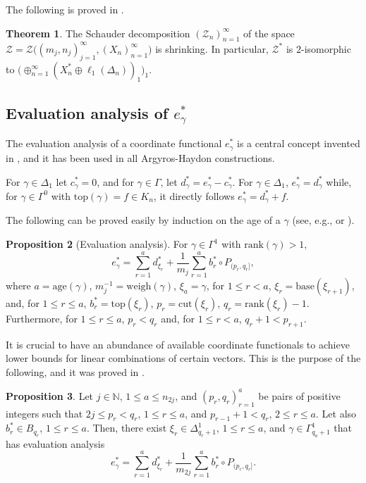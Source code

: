 \documentclass[11pt]{amsart}
\theoremstyle{definition}
\newtheorem{theorem}{Theorem}[section]
\newtheorem{proposition}[theorem]{Proposition}
\newcommand{\N}{\mathbb{N}}
\numberwithin{equation}{section}
\begin{document}
The following is proved in \cite[Corollary 5.15]{zisimopoulou:2014}.

\begin{theorem}
\label{shrinking and duality}
The Schauder decomposition $(\mathcal{Z}_n)_{n=1}^\infty$ of the space $\mathcal{Z} = \mathcal{Z}\big((m_j,n_j)_{j=1}^\infty,(X_n)_{n=1}^\infty\big)$ is shrinking. In particular, $\mathcal{Z}^*$ is $2$-isomorphic to $\big(\oplus_{n=1}^\infty(X_n^*\oplus\ell_1(\Delta_n))_1\big)_1$.
\end{theorem}

\subsection{Evaluation analysis of $e_\gamma^*$}
The evaluation analysis of a coordinate functional $e_\gamma^*$ is a central concept invented in \cite{argyros:haydon:2011}, and it has been used in all Argyros-Haydon constructions.

For $\gamma\in\Delta_1$ let $c_\gamma^* = 0$, and for $\gamma\in\Gamma$, let $d_\gamma^* = e_\gamma^* - c^*_\gamma$. For $\gamma\in\Delta_1$, $e_\gamma^* = d_\gamma^*$ while, for $\gamma\in\Gamma^0$ with $\mathrm{top}(\gamma) = f\in K_n$, it directly follows $e_\gamma^* = d_{\gamma}^*+f$.

The following can be proved easily by induction on the age of a $\gamma$ (see, e.g., \cite[Proposition 5.3]{zisimopoulou:2014} or \cite[Proposition 4.5]{argyros:haydon:2011}).

\begin{proposition}[Evaluation analysis]
For $\gamma\in\Gamma^1$ with $\mathrm{rank}(\gamma)>1$,
\[e_\gamma^* = \sum_{r=1}^ad_{\xi_r}^* + \frac{1}{m_j}\sum_{r=1}^ab_r^*\circ P_{(p_r,q_r]},\]
where $a=\mathrm{age}(\gamma)$, $m_j^{-1}=\mathrm{weigh}(\gamma)$, $\xi_a = \gamma$, for $1\leq r<a$, $\xi_r = \mathrm{base}(\xi_{r+1})$, and, for $1\leq r\leq a$, $b_r^*=\mathrm{top}(\xi_r)$, $p_r = \mathrm{cut}(\xi_r)$, $q_r = \mathrm{rank}(\xi_r)-1$. Furthermore, for $1\leq r\leq a$, $p_r<q_r$ and, for $1\leq r<a$, $q_r+1<p_{r+1}$. 
\end{proposition}

It is crucial to have an abundance of available coordinate functionals to achieve lower bounds for linear combinations of certain vectors. This is the purpose of the following, and it was proved in \cite[Proposition 4.7]{argyros:haydon:2011}.

\begin{proposition}
\label{coordinate builder}
Let $j\in\N$, $1\leq a\leq n_{2j}$, and $(p_r,q_r)_{r=1}^a$ be pairs of positive integers such that $2j\leq p_r<q_r$, $1\leq r\leq a$, and $p_{r-1}+1<q_r$, $2\leq r\leq a$. Let also $b_r^*\in B_{q_r}$, $1\leq r\leq a$. Then, there exist $\xi_r\in\Delta^1_{q_r+1}$, $1\leq r\leq a$,  and $\gamma\in\Gamma^1_{q_a+1}$ that has evaluation analysis
\[e_\gamma^* = \sum_{r=1}^ad_{\xi_r}^* + \frac{1}{m_{2j}}\sum_{r=1}^ab_r^*\circ P_{(p_r,q_r]}.\]
\end{proposition}
\end{document}
